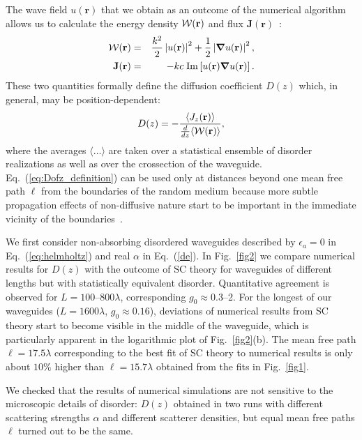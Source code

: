 The wave field $u(\mathbf{r})$ that we obtain as an outcome of the numerical algorithm allows us to calculate the energy density ${\cal W}(\mathbf{r})$ and flux $\mathbf{J}(\mathbf{r})$~\cite{1953_Morse}:
\begin{eqnarray}
{\cal W}({\bf r}) &=& \frac{k^2}{2}\left|u({\bf r})\right|^2 + \frac{1}{2}\left| \mbox{\boldmath$\nabla$} u({\bf r})\right|^2, \label{eq:W}\\
{\bf  J}({\bf r}) &=& -kc\; \mathrm{Im} \left[u({\bf r})\mbox{\boldmath$\nabla$} u({\bf r})\right]. \label{eq:J}
\end{eqnarray}
These two quantities formally define the diffusion coefficient $D(z)$ which, in general, may be position-dependent:
\begin{equation}
D(z) = -\frac{\langle J_z(\mathbf{r}) \rangle}{\frac{d}{d z} \langle{\cal W}(\mathbf{r}) \rangle},
\label{eq:Dofz_definition}
\end{equation}
where the averages $\langle \ldots \rangle$ are taken over a statistical ensemble of disorder realizations as well as over the crossection of the waveguide. Eq.~(\ref{eq:Dofz_definition}) can be used only at distances beyond one mean free path $\ell$ from the boundaries of the random medium because more subtle propagation effects of non-diffusive nature start to be important in the immediate vicinity of the boundaries~\cite{2007_Akkermans_book}.

We first consider non-absorbing disordered waveguides described by $\epsilon_a = 0$ in Eq.~(\ref{eq:helmholtz}) and real $\alpha$ in Eq.~(\ref{de}).
In Fig.~\ref{fig2} we compare numerical results for $D(z)$ with the outcome of SC theory for waveguides of different lengths but with statistically equivalent disorder. Quantitative agreement is observed for $L = 100$--$800 \lambda$, corresponding $g_0 \approx 0.3$--2. For the longest of our waveguides ($L = 1600\lambda$, $g_0 \approx 0.16$), deviations of numerical results from SC theory start to become visible in the middle of the waveguide, which is particularly apparent in the logarithmic plot of Fig.~\ref{fig2}(b).
The mean free path $\ell = 17.5\lambda$ corresponding to the best fit of SC theory to numerical results is only about $10\%$ higher than $\ell = 15.7 \lambda$ obtained from the fits in Fig.~\ref{fig1}.

We checked that the results of numerical simulations are not sensitive to the microscopic details of disorder: $D(z)$ obtained in two runs with different scattering strengths $\alpha$ and different scatterer densities, but equal mean free paths $\ell$ turned out to be the same.

